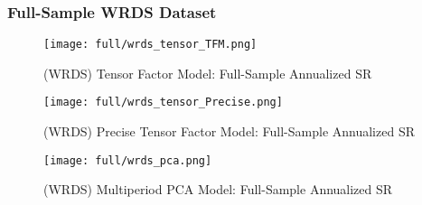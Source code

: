 \subsubsection{Full-Sample WRDS Dataset}

\begin{figure}[H]
    \centering
    \texttt{[image: full/wrds\_tensor\_TFM.png]}
    \caption{(WRDS) Tensor Factor Model: Full-Sample Annualized SR}
    \label{fig:wrds-primary-tfm}
\end{figure}

\begin{figure}[H]
    \centering
    \texttt{[image: full/wrds\_tensor\_Precise.png]}
    \caption{(WRDS) Precise Tensor Factor Model: Full-Sample Annualized SR}
    \label{fig:wrds-primary-precise}
\end{figure}


\begin{figure}[H]
    \centering
    \texttt{[image: full/wrds\_pca.png]}
    \caption{(WRDS) Multiperiod PCA Model: Full-Sample Annualized SR}
    \label{fig:wrds-primary-pca}
\end{figure}
